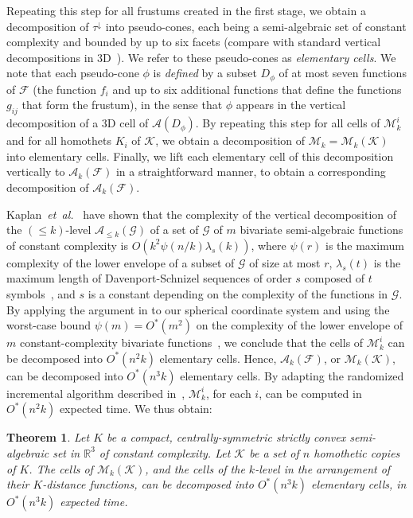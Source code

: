 \documentclass[11pt]{article}
\def\reals{{\mathbb R}}
\def\A{\mathcal{A}}
\def\F{\mathcal{F}}
\def\G{\mathcal{G}}
\def\K{\mathcal{K}}
\def\M{\mathcal{M}}
\def\cell{\tau}
\def\Ak#1{\A_{{\le}#1}}
\def\etal{\textsl{et~al.}}
\newtheorem{theorem}{Theorem}[section]
\theoremstyle{definition}
\begin{document}
Repeating this step for all frustums created in the first stage, we obtain
a decomposition of $\cell^\downarrow$ into pseudo-cones,
each being a semi-algebraic set of constant complexity and bounded by up to six facets
(compare with standard vertical decompositions in 3D~\cite{CEGS}). 
We refer to these pseudo-cones as \emph{elementary cells}. We note that each pseudo-cone 
$\phi$ is \emph{defined} by a subset $D_\phi$ of at most seven functions of $\F$ (the function $f_i$
and up to six additional functions that define the functions $g_{ij}$ that form the frustum), 
in the sense that $\phi$ appears in the vertical decomposition of a 3D cell of $\A(D_\phi)$.
By repeating this step for all cells of $\M_k^i$ and for all homothets $K_i$ of $\K$, 
we obtain a decomposition of $\M_k = \M_k(\K)$ into elementary cells. Finally, we 
lift each elementary cell of this decomposition vertically to $\A_k(\F)$ in a straightforward manner,
to obtain a corresponding decomposition of $\A_k(\F)$.

Kaplan~\etal~\cite[Lemma~6.2]{KMRSS} have shown that the complexity of the vertical decomposition of 
the $(\le k)$-level $\Ak{k}(\G)$ of a set of $\G$ of $m$ bivariate semi-algebraic functions of constant 
complexity is $O(k^2\psi(n/k)\lambda_s(k))$, where $\psi(r)$ is the maximum complexity of 
the lower envelope of a subset of $\G$ of size at most $r$, $\lambda_s(t)$ is the maximum 
length of Davenport-Schnizel sequences of order $s$ composed of $t$ symbols~\cite{SA}, 
and $s$ is a constant depending on the complexity of the functions in $\G$.
By applying the argument in \cite{KMRSS} to our spherical coordinate system and using
the worst-case bound $\psi(m) = O^*(m^2)$ on the complexity of the lower envelope
of $m$ constant-complexity bivariate functions~\cite{SA}, 
we conclude that the cells of $\M_k^i$ can be decomposed into $O^*(n^2k)$ elementary cells. 
Hence, $\A_k(\F)$, or $\M_k(\K)$, can be decomposed into $O^*(n^3k)$ elementary cells. 
By adapting the randomized incremental algorithm described in~\cite{KMRSS}, $\M_k^i$, for each 
$i$, can be computed in $O^*(n^2k)$ expected time. We thus obtain:

\begin{theorem} \label{thm:decomp}
Let $K$ be a compact, centrally-symmetric strictly convex semi-algebraic set in $\reals^3$ of constant 
complexity. Let $\K$ be a set of $n$ homothetic copies of $K$. The cells of $\M_k(\K)$, 
and the cells of the $k$-level in the arrangement of their $K$-distance 
functions, can be decomposed into $O^*(n^3k)$ elementary cells, in $O^*(n^3k)$ expected time.
\end{theorem}
\end{document}
